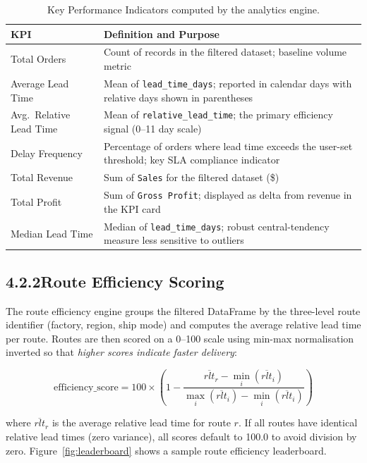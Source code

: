 \documentclass[12pt, a4paper]{report}
\begin{document}
\begin{table}[H]
  \centering
  \caption{Key Performance Indicators computed by the analytics engine.}
  \label{tab:kpis}
  \begin{tabularx}{\textwidth}{@{} L{0.28\textwidth} X @{}}
    \toprule
    \textbf{KPI} & \textbf{Definition and Purpose} \\
    \midrule
    Total Orders         & Count of records in the filtered dataset; baseline volume metric \\[4pt]
    Average Lead Time    & Mean of \texttt{lead\_time\_days}; reported in calendar days with relative days shown in parentheses \\[4pt]
    Avg.\ Relative Lead Time & Mean of \texttt{relative\_lead\_time}; the primary efficiency signal (0--11 day scale) \\[4pt]
    Delay Frequency      & Percentage of orders where lead time exceeds the user-set threshold; key SLA compliance indicator \\[4pt]
    Total Revenue        & Sum of \texttt{Sales} for the filtered dataset (\$) \\[4pt]
    Total Profit         & Sum of \texttt{Gross Profit}; displayed as delta from revenue in the KPI card \\[4pt]
    Median Lead Time     & Median of \texttt{lead\_time\_days}; robust central-tendency measure less sensitive to outliers \\
    \bottomrule
  \end{tabularx}
\end{table}

\subsection*{4.2.2\quad Route Efficiency Scoring}

The route efficiency engine groups the filtered DataFrame by the three-level
route identifier (factory, region, ship mode) and computes the average
relative lead time per route. Routes are then scored on a 0--100 scale
using min-max normalisation inverted so that \emph{higher scores indicate
faster delivery}:

\[
  \text{efficiency\_score} = 100 \times
  \left(1 - \frac{\overline{rlt}_r - \min_i(\overline{rlt}_i)}
                 {\max_i(\overline{rlt}_i) - \min_i(\overline{rlt}_i)}\right)
\]

where $\overline{rlt}_r$ is the average relative lead time for route $r$.
If all routes have identical relative lead times (zero variance), all scores
default to 100.0 to avoid division by zero. Figure~\ref{fig:leaderboard}
shows a sample route efficiency leaderboard.
\end{document}
